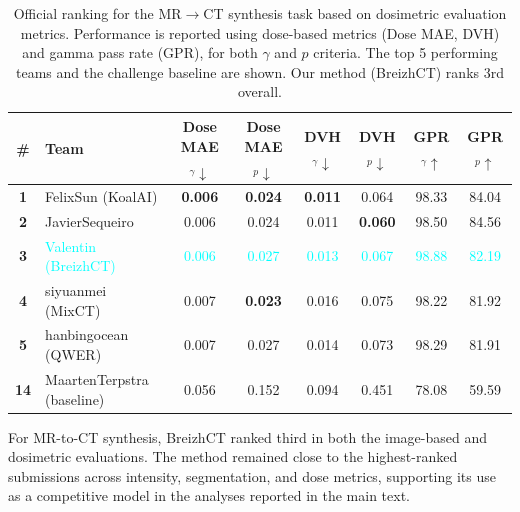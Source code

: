 \documentclass[lettersize,journal]{IEEEtran}
\begin{document}
\begin{table}[h!]
\centering
\scriptsize
\renewcommand{\arraystretch}{1}
\setlength{\tabcolsep}{4pt}
\caption{
Official ranking for the MR$\rightarrow$CT synthesis task based on dosimetric evaluation metrics. Performance is reported using dose-based metrics (Dose MAE, DVH) and gamma pass rate (GPR), for both $\gamma$ and $p$ criteria. The top 5 performing teams and the challenge baseline are shown. Our method (BreizhCT) ranks 3rd overall.
}
\label{tab:mrct_dose}
\begin{tabular}{clcccccc}
\toprule
\textbf{\#} & \textbf{Team} 
& \textbf{Dose MAE$_\gamma\downarrow$} 
& \textbf{Dose MAE$_p\downarrow$} 
& \textbf{DVH$_\gamma\downarrow$} 
& \textbf{DVH$_p\downarrow$} 
& \textbf{GPR$_\gamma\uparrow$} 
& \textbf{GPR$_p\uparrow$} \\
\midrule
\textbf{1} & FelixSun (KoalAI) 
& \textbf{0.006} & \textbf{0.024} & \textbf{0.011} & 0.064 & 98.33 & 84.04 \\
\textbf{2} & JavierSequeiro 
& 0.006 & 0.024 & 0.011 & \textbf{0.060} & 98.50 & 84.56 \\
\textbf{3} & \textcolor{cyan}{Valentin (BreizhCT)} 
& \textcolor{cyan}{0.006} & \textcolor{cyan}{0.027} & \textcolor{cyan}{0.013} & \textcolor{cyan}{0.067} & \textcolor{cyan}{98.88} & \textcolor{cyan}{82.19} \\
\textbf{4} & siyuanmei (MixCT) 
& 0.007 & \textbf{0.023} & 0.016 & 0.075 & 98.22 & 81.92 \\
\textbf{5} & hanbingocean (QWER) 
& 0.007 & 0.027 & 0.014 & 0.073 & 98.29 & 81.91 \\
\midrule
\textbf{14} & MaartenTerpstra (baseline) 
& 0.056 & 0.152 & 0.094 & 0.451 & 78.08 & 59.59 \\
\bottomrule
\end{tabular}

\end{table}

For MR-to-CT synthesis, BreizhCT ranked third in both the image-based and dosimetric evaluations. The method remained close to the highest-ranked submissions across intensity, segmentation, and dose metrics, supporting its use as a competitive model in the analyses reported in the main text.
\end{document}
